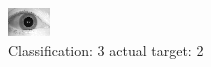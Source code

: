 \begin{figure}[h!]
\begin{center}
\includegraphics[width=0.60\columnwidth]{figures/ID1680_class_3_target_2.png}
\end{center}
\caption{ Classification: 3 actual target: 2}
\label{fig:ID1680_class_3_target_2}
\end{figure}

